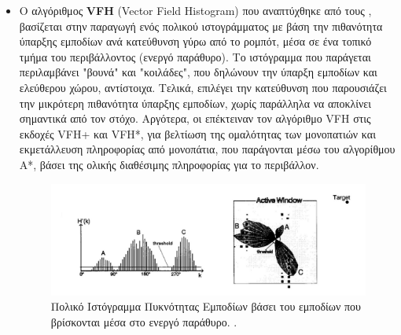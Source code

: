 \begin{itemize}
	
\item 	Ο αλγόριθμος \textbf{VFH} (Vector Field Histogram) που αναπτύχθηκε από τους \citeauthor{vfh} \cite{vfh}, βασίζεται στην παραγωγή ενός πολικού ιστογράμματος με βάση την πιθανότητα ύπαρξης εμποδίων ανά κατεύθυνση γύρω από το ρομπότ, μέσα σε ένα τοπικό τμήμα του περιβάλλοντος (ενεργό παράθυρο). Το ιστόγραμμα που παράγεται περιλαμβάνει "βουνά" και "κοιλάδες", που δηλώνουν την ύπαρξη εμποδίων και ελεύθερου χώρου, αντίστοιχα. Τελικά, επιλέγει την κατεύθυνση που παρουσιάζει την μικρότερη πιθανότητα ύπαρξης εμποδίων, χωρίς παράλληλα να αποκλίνει σημαντικά από τον στόχο. Αργότερα, οι \citeauthor{vfhp} επέκτειναν τον αλγόριθμο VFH στις εκδοχές VFH+\cite{vfhp} και VFH*\cite{vfhs}, για βελτίωση της ομαλότητας των μονοπατιών και εκμετάλλευση πληροφορίας από μονοπάτια, που παράγονται μέσω του αλγορίθμου A*, βάσει της ολικής διαθέσιμης πληροφορίας για το περιβάλλον.

\begin{figure}[!ht]
	\centering
	\includegraphics[width=0.8\linewidth]{Chapters/Chapter3/Figures/vfh.jpg}
	\caption[Πολικό Ιστόγραμμα Πυκνότητας Εμποδίων βάσει του εμποδίων που βρίσκονται μέσα στο ενεργό παράθυρο.]{Πολικό Ιστόγραμμα Πυκνότητας Εμποδίων βάσει του εμποδίων που βρίσκονται μέσα στο ενεργό παράθυρο. \cite{vfh}.}
	\label{fig:vfh}
\end{figure}
	

\end{itemize}
